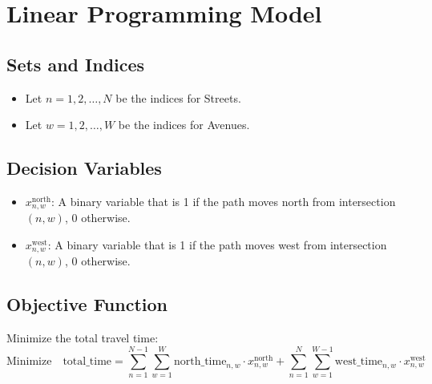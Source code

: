 \documentclass{article}
\begin{document}
\section*{Linear Programming Model}

\subsection*{Sets and Indices}
\begin{itemize}
    \item Let $n = 1, 2, \ldots, N$ be the indices for Streets.
    \item Let $w = 1, 2, \ldots, W$ be the indices for Avenues.
\end{itemize}

\subsection*{Decision Variables}
\begin{itemize}
    \item $x_{n,w}^{\text{north}}$: A binary variable that is 1 if the path moves north from intersection $(n, w)$, 0 otherwise.
    \item $x_{n,w}^{\text{west}}$: A binary variable that is 1 if the path moves west from intersection $(n, w)$, 0 otherwise.
\end{itemize}

\subsection*{Objective Function}
Minimize the total travel time:
\[
\text{Minimize} \quad \text{total\_time} = \sum_{n=1}^{N-1} \sum_{w=1}^{W} \text{north\_time}_{n,w} \cdot x_{n,w}^{\text{north}} + \sum_{n=1}^{N} \sum_{w=1}^{W-1} \text{west\_time}_{n,w} \cdot x_{n,w}^{\text{west}}
\]
\end{document}
